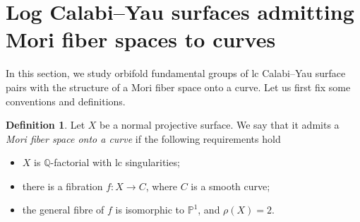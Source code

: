 \documentclass{amsart}
\newcommand{\pp}{\mathbb{P}}
\newcommand{\qq}{\mathbb{Q}}
\theoremstyle{definition}
\newtheorem{definition}[theorem]{Definition}
\newtheorem{remark}[theorem]{Remark}
\theoremstyle{remark}
\numberwithin{equation}{section}
\begin{document}

\section{Log Calabi--Yau surfaces admitting Mori fiber spaces to curves}
\label{sec:mfs}

In this section, we study orbifold fundamental groups of lc Calabi--Yau surface pairs with the structure of a Mori fiber space onto a curve. Let us first fix some conventions and definitions.

\begin{definition}
    Let $X$ be a normal projective surface. We say that it admits a {\it Mori fiber space onto a curve} if the following requirements hold
    \begin{itemize}
        \item $X$ is $\qq$-factorial with lc singularities;
        \item there is a fibration $f:X\to C$, where $C$ is a smooth curve;
        \item the general fibre of $f$ is isomorphic to $\pp^1$, and $\rho(X)=2$.
    \end{itemize}
\end{definition}
\end{document}
